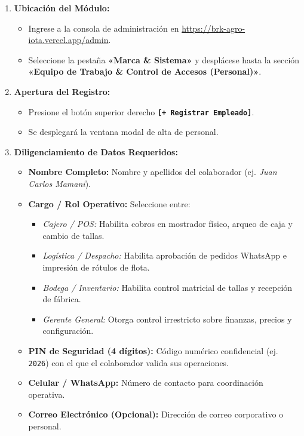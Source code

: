 \documentclass[11pt,a4paper]{article}
\begin{document}
\begin{propbox}
\begin{enumerate}
    \item \textbf{Ubicación del Módulo:}
    \begin{itemize}
        \item Ingrese a la consola de administración en \url{https://brk-agro-iota.vercel.app/admin}.
        \item Seleccione la pestaña \textbf{«Marca \& Sistema»} y desplácese hasta la sección \textbf{«Equipo de Trabajo \& Control de Accesos (Personal)»}.
    \end{itemize}

    \item \textbf{Apertura del Registro:}
    \begin{itemize}
        \item Presione el botón superior derecho \textbf{\texttt{[+ Registrar Empleado]}}.
        \item Se desplegará la ventana modal de alta de personal.
    \end{itemize}

    \item \textbf{Diligenciamiento de Datos Requeridos:}
    \begin{itemize}
        \item \textbf{Nombre Completo:} Nombre y apellidos del colaborador (ej. \textit{Juan Carlos Mamani}).
        \item \textbf{Cargo / Rol Operativo:} Seleccione entre:
        \begin{itemize}
            \item \textit{Cajero / POS:} Habilita cobros en mostrador físico, arqueo de caja y cambio de tallas.
            \item \textit{Logística / Despacho:} Habilita aprobación de pedidos WhatsApp e impresión de rótulos de flota.
            \item \textit{Bodega / Inventario:} Habilita control matricial de tallas y recepción de fábrica.
            \item \textit{Gerente General:} Otorga control irrestricto sobre finanzas, precios y configuración.
        \end{itemize}
        \item \textbf{PIN de Seguridad (4 dígitos):} Código numérico confidencial (ej. \texttt{2026}) con el que el colaborador valida sus operaciones.
        \item \textbf{Celular / WhatsApp:} Número de contacto para coordinación operativa.
        \item \textbf{Correo Electrónico (Opcional):} Dirección de correo corporativo o personal.
    \end{itemize}


\end{enumerate}
\end{propbox}
\end{document}
